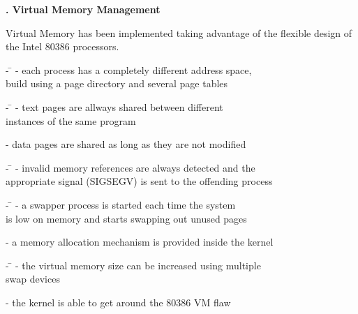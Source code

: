 \begin{slide}{}


{\small \bf {}. Virtual Memory Management\\
}

\vspace{2cm}

{\tiny Virtual Memory has been implemented taking advantage of the
flexible design of the Intel 80386 processors.

\vspace{1cm}


\begin{tabbing}
\hspace{1cm} - \= \kill
\hspace{1cm} - each process has a completely different address space,\\
\> build using a page directory and several page tables
\end{tabbing}

\begin{tabbing}
\hspace{1cm} - \= \kill
\hspace{1cm} - text pages are allways shared between different\\
\> instances of the same program
\end{tabbing}

\hspace{1cm} - data pages are shared as long as they are not modified

\begin{tabbing}
\hspace{1cm} - \= \kill
\hspace{1cm} - invalid memory references are always detected and the\\
\> appropriate signal (SIGSEGV) is sent to the offending process
\end{tabbing}

\begin{tabbing}
\hspace{1cm} - \= \kill
\hspace{1cm} - a swapper process is started each time the system\\
\> is low on memory and starts swapping out unused pages
\end{tabbing}

\hspace{1cm} - a memory allocation mechanism is provided inside the kernel

\begin{tabbing}
\hspace{1cm} - \= \kill
\hspace{1cm} - the virtual memory size can be increased using multiple\\
\> swap devices
\end{tabbing}

\hspace{1cm} - the kernel is able to get around the 80386 VM flaw

}

\end{slide}
